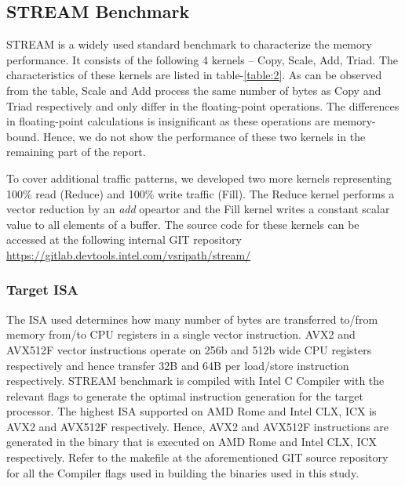 \documentclass{article}
\begin{document}
\subsection{STREAM Benchmark}
STREAM is a widely used standard benchmark to characterize the memory performance. It consists of the following 4 kernels -- Copy, Scale, Add, Triad. The characteristics of these kernels are listed in table-\ref{table:2}. As can be observed from the table, Scale and Add process the same number of bytes as Copy and Triad respectively and only differ in the floating-point operations. The differences in floating-point calculations is insignificant as these operations are memory-bound. Hence, we do not show the performance of these two kernels in the remaining part of the report.

To cover additional traffic patterns, we developed two more kernels representing 100\% read (Reduce) and 100\% write traffic (Fill). The Reduce kernel performs a vector reduction by an \textit{add} opeartor and the Fill kernel writes a constant scalar value to all elements of a buffer. The source code for these kernels can be accessed at the following internal GIT repository \url{https://gitlab.devtools.intel.com/vsripath/stream/}

\subsubsection{Target ISA}
The ISA used determines how many number of bytes are transferred to/from memory from/to CPU registers in a single vector instruction. AVX2 and AVX512F vector instructions operate on 256b and 512b wide CPU registers respectively and hence transfer 32B and 64B per load/store instruction respectively. STREAM benchmark is compiled with Intel C Compiler with the relevant flags to generate the optimal instruction generation for the target processor. The highest ISA supported on AMD Rome and Intel CLX, ICX is AVX2 and AVX512F respectively. Hence, AVX2 and AVX512F instructions are generated in the binary that is executed on AMD Rome and Intel CLX, ICX respectively. Refer to the makefile at the aforementioned GIT source repository for all the Compiler flags used in building the binaries used in this study.
\end{document}
